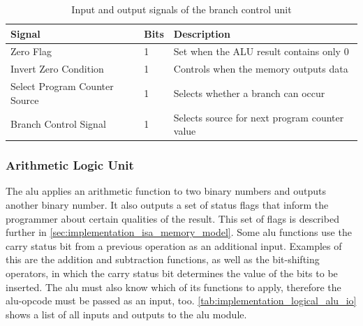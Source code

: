 \begin{table}[H]
    \centering
    \begin{tabular}{|l|l|l|} 
        \hline
        \textbf{\textbf{Signal}}      & \textbf{Bits} & \textbf{Description}                           \\ 
        \hline
        Zero Flag                     & 1             & Set when the ALU result contains only 0        \\ 
        \hline
        Invert Zero Condition         & 1             & Controls when the memory outputs data          \\ 
        \hline
        Select Program Counter Source & 1             & Selects whether a branch can occur             \\ 
        \hline
        Branch Control Signal         & 1             & Selects source for next program counter value  \\
        \hline
    \end{tabular}
    \caption{Input and output signals of the branch control unit}
    \label{tab:implementation_branch_control_io}
\end{table}

\subsubsection{Arithmetic Logic Unit}

The \ac{alu} applies an arithmetic function to two binary numbers and outputs another binary number. It also outputs a set of status flags that inform the programmer about certain qualities of the result. This set of flags is described further in \autoref{sec:implementation_isa_memory_model}. Some \ac{alu} functions use the carry status bit from a previous operation as an additional input. Examples of this are the addition and subtraction functions, as well as the bit-shifting operators, in which the carry status bit determines the value of the bits to be inserted. The \ac{alu} must also know which of its functions to apply, therefore the \ac{alu}-opcode must be passed as an input, too. \autoref{tab:implementation_logical_alu_io} shows a list of all inputs and outputs to the \ac{alu} module.

